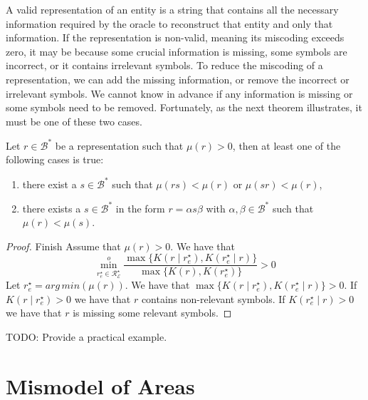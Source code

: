 {\color{red}

A valid representation of an entity is a string that contains all the necessary information required by the oracle to reconstruct that entity and only that information. If the representation is non-valid, meaning its miscoding exceeds zero, it may be because some crucial information is missing, some symbols are incorrect, or it contains irrelevant symbols. To reduce the miscoding of a representation, we can add the missing information, or remove the incorrect or irrelevant symbols. We cannot know in advance if any information is missing or some symbols need to be removed. Fortunately, as the next theorem illustrates, it must be one of these two cases.

\begin{theorem}
\label{th:reduce_miscoding}
Let $r \in \mathcal{B}^\ast$ be a representation such that $\mu(r) >0$, then at least one of the following cases is true:
\begin{enumerate}[label=(\roman*)]
\item there exist a $s \in \mathcal{B}^\ast$ such that $\mu(rs) < \mu(r)$ or $\mu(sr) < \mu(r)$,
\item there exists a $s \in \mathcal{B}^\ast$ in the form $r = \alpha s \beta$ with $\alpha, \beta \in \mathcal{B}^\ast$ such that $\mu(r) < \mu(s)$.
\end{enumerate}
\end{theorem}
\begin{proof}
{\color{red} Finish}
Assume that $\mu(r) >0$. We have that
\[
\overset{o}{ \underset{ r^\star_e \in \mathcal{R}^\star_\mathcal{E} } \min} \frac{ \max\{ K \left( r \mid r^\star_e \right), K \left( r^\star_e \mid r \right) \} } { \max\{ K \left( r \right), K \left( r^\star_e \right) \} } > 0
\]
Let $r^\star_e = arg\,min \left( \mu(r) \right)$. We have that $\max\{ K \left( r \mid r^\star_e \right), K \left( r^\star_e \mid r \right) \} > 0$. If $K \left( r \mid r^\star_e \right) > 0$ we have that $r$ contains non-relevant symbols. If $K \left( r^\star_e \mid r \right) > 0$ we have that $r$ is missing some relevant symbols.
\end{proof}

\begin{example}
{\color{red} TODO: Provide a practical example.}
\end{example}

}

%
%
\section{Mismodel of Areas}

